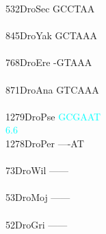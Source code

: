 \documentclass[11pt,twoside,reqno,a4paper]{article}
\begin{document}
{532\hspace*{2\charwidth}DroSec	GCCTAA\\
\hspace*{5\charwidth}\hspace*{7\charwidth}\\
845\hspace*{2\charwidth}DroYak	GCTAAA\\
\hspace*{5\charwidth}\hspace*{7\charwidth}\\
768\hspace*{2\charwidth}DroEre	-GTAAA\\
\hspace*{5\charwidth}\hspace*{7\charwidth}\\
871\hspace*{2\charwidth}DroAna	GTCAAA\\
\hspace*{5\charwidth}\hspace*{7\charwidth}\\
1279\hspace*{1\charwidth}DroPse	\textcolor{cyan}{G}\textcolor{cyan}{C}\textcolor{cyan}{G}\textcolor{cyan}{A}\textcolor{cyan}{A}\textcolor{cyan}{T}\\
\hspace*{5\charwidth}\hspace*{7\charwidth}\hspace*{0\charwidth}\textcolor{cyan}{6.6}\\
1278\hspace*{1\charwidth}DroPer	----AT\\
\hspace*{5\charwidth}\hspace*{7\charwidth}\\
73\hspace*{3\charwidth}DroWil	------\\
\hspace*{5\charwidth}\hspace*{7\charwidth}\\
53\hspace*{3\charwidth}DroMoj	------\\
\hspace*{5\charwidth}\hspace*{7\charwidth}\\
52\hspace*{3\charwidth}DroGri	------\\
\hspace*{5\charwidth}\hspace*{7\charwidth}\\
\\
}
\end{document}
